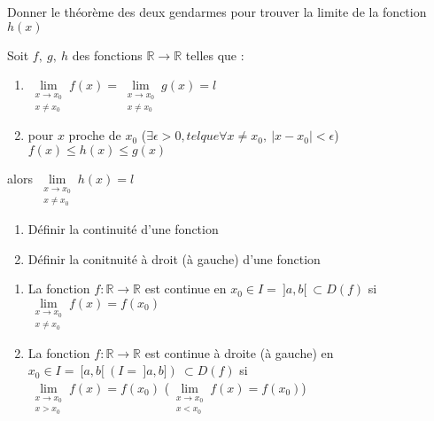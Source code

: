 \documentclass[12pt]{article}
\newcommand*{\xfield}[1]{\begin{mdframed}\centering #1\end{mdframed}\bigskip}
\newenvironment{note}{}{}
\begin{document}
\begin{note}
	\xfield{Donner le théorème des deux gendarmes pour trouver la limite de la fonction $h(x)$}
	\xfield{Soit $f,\ g,\ h$ des fonctions $\mathbb{R} \to \mathbb{R}$ telles que :
	\begin{enumerate}
		\item $\lim\limits_{\substack{x\to x_0\\x \neq x_0}}f(x) = \lim\limits_{\substack{x\to x_0\\x \neq x_0}}g(x) = l$
		\item pour $x$ proche de $x_0$ ($\exists \epsilon > 0, tel que \forall x \neq x_0,\ |x-x_0| < \epsilon$)\\
		$f(x) \le h(x) \le g(x)$
	\end{enumerate}
	alors  $\lim\limits_{\substack{x\to x_0\\x \neq x_0}}h(x) = l$}
\end{note}

\begin{note}
	\xfield{\begin{enumerate}
		\item Définir la continuité d'une fonction
		\item Définir la conitnuité à droit (à gauche) d'une fonction
	\end{enumerate} }
	\xfield{\begin{enumerate}
		\item La fonction $f:\mathbb{R}\to \mathbb{R}$ est continue en $x_0 \in I =\ ]a,b[\ \subset D(f)$ si $\lim\limits_{\substack{x\to x_0\\x \neq x_0}}f(x) = f(x_0)$
		\item La fonction $f:\mathbb{R}\to \mathbb{R}$ est continue à droite (à gauche) en $x_0 \in I =\ [a,b[\ (I =\ ]a,b])\ \subset D(f)$ si\\
		 $\lim\limits_{\substack{x\to x_0\\x > x_0}}f(x) = f(x_0)$ ($\lim\limits_{\substack{x\to x_0\\x < x_0}}f(x) = f(x_0)$)
	\end{enumerate} }
\end{note}
\end{document}
